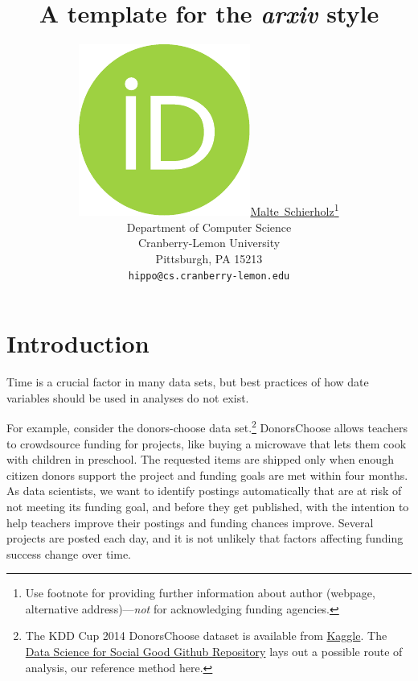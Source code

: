 \documentclass{article}
\title{A template for the \emph{arxiv} style}
\author{ \href{https://orcid.org/0000-0003-4058-1543}{\includegraphics[scale=0.06]{orcid.pdf}\hspace{1mm}Malte~Schierholz}\thanks{Use footnote for providing further
		information about author (webpage, alternative
		address)---\emph{not} for acknowledging funding agencies.} \\
	Department of Computer Science\\
	Cranberry-Lemon University\\
	Pittsburgh, PA 15213 \\
	\texttt{hippo@cs.cranberry-lemon.edu} \\
}
\begin{document}
\maketitle

\begin{abstract}
	\lipsum[1]
\end{abstract}




\section{Introduction}\label{sec:introduction}

Time is a crucial factor in many data sets, but best practices of how date variables should be used in analyses do not exist.

For example, consider the donors-choose data set.\footnote{The KDD Cup 2014 DonorsChoose dataset is available from \href{https://www.kaggle.com/c/kdd-cup-2014-predicting-excitement-at-donors-choose/data}{Kaggle}. The \href{https://github.com/dssg/donors-choose}{Data Science for Social Good Github Repository} lays out a possible route of analysis, our reference method here.} DonorsChoose allows teachers to crowdsource funding for projects, like buying a microwave that lets them cook with children in preschool. The requested items are shipped only when enough citizen donors support the project and funding goals are met within four months. As data scientists, we want to identify postings automatically that are at risk of not meeting its funding goal, and before they get published, with the intention to help teachers improve their postings and funding chances improve. Several projects are posted each day, and it is not unlikely that factors affecting funding success change over time.
\end{document}
